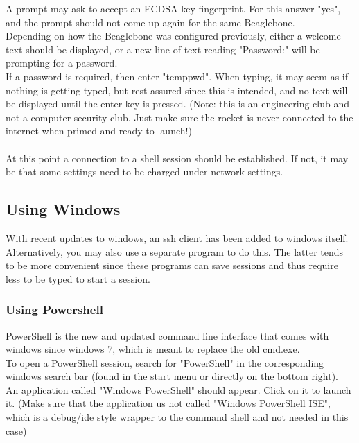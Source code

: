 \documentclass[12pt,article]{memoir}
\begin{document}
\noindent
A prompt may ask to accept an ECDSA key fingerprint. For this answer "yes", and the prompt should not come up again for the same Beaglebone.\\

\noindent
Depending on how the Beaglebone was configured previously, either a welcome text should be displayed, or a new line of text reading "Password:" will be prompting for a password.\\
If a password is required, then enter "temppwd". When typing, it may seem as if nothing is getting typed, but rest assured since this is intended, and no text will be displayed until the enter key is pressed. (Note: this is an engineering club and not a computer security club. Just make sure the rocket is never connected to the internet when primed and ready to launch!)\\\\

\noindent
At this point a connection to a shell session should be established. If not, it may be that some settings need to be charged under network settings.\\


\newpage
\subsection{Using Windows}
With recent updates to windows, an ssh client has been added to windows itself. Alternatively, you may also use a separate program to do this. The latter tends to be more convenient since these programs can save sessions and thus require less to be typed to start a session.

\subsubsection{Using Powershell}
PowerShell is the new and updated command line interface that comes with windows since windows 7, which is meant to replace the old cmd.exe.\\
To open a PowerShell session, search for "PowerShell" in the corresponding windows search bar (found in the start menu or directly on the bottom right).\\
An application called "Windows PowerShell" should appear. Click on it to launch it. (Make sure that the application us not called "Windows PowerShell ISE", which is a debug/ide style wrapper to the command shell and not needed in this case)\\\\
\end{document}
